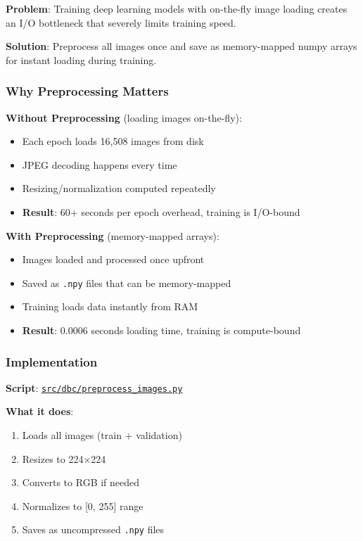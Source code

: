 \documentclass[
  letterpaper,
  DIV=11,
  numbers=noendperiod]{scrartcl}
\providecommand{\tightlist}{%
  \setlength{\itemsep}{0pt}\setlength{\parskip}{0pt}}
\begin{document}
\textbf{Problem}: Training deep learning models with on-the-fly image
loading creates an I/O bottleneck that severely limits training speed.

\textbf{Solution}: Preprocess all images once and save as memory-mapped
numpy arrays for instant loading during training.

\subsubsection{Why Preprocessing
Matters}\label{why-preprocessing-matters}

\textbf{Without Preprocessing} (loading images on-the-fly):

\begin{itemize}
\tightlist
\item
  Each epoch loads 16,508 images from disk
\item
  JPEG decoding happens every time
\item
  Resizing/normalization computed repeatedly
\item
  \textbf{Result}: 60+ seconds per epoch overhead, training is I/O-bound
\end{itemize}

\textbf{With Preprocessing} (memory-mapped arrays):

\begin{itemize}
\tightlist
\item
  Images loaded and processed once upfront
\item
  Saved as \texttt{.npy} files that can be memory-mapped
\item
  Training loads data instantly from RAM
\item
  \textbf{Result}: 0.0006 seconds loading time, training is
  compute-bound
\end{itemize}

\subsubsection{Implementation}\label{implementation}

\textbf{Script}:
\href{../src/dbc/preprocess_images.py}{\texttt{src/dbc/preprocess\_images.py}}

\textbf{What it does}:

\begin{enumerate}
\def\labelenumi{\arabic{enumi}.}
\tightlist
\item
  Loads all images (train + validation)
\item
  Resizes to 224×224
\item
  Converts to RGB if needed
\item
  Normalizes to {[}0, 255{]} range
\item
  Saves as uncompressed \texttt{.npy} files
\end{enumerate}
\end{document}
